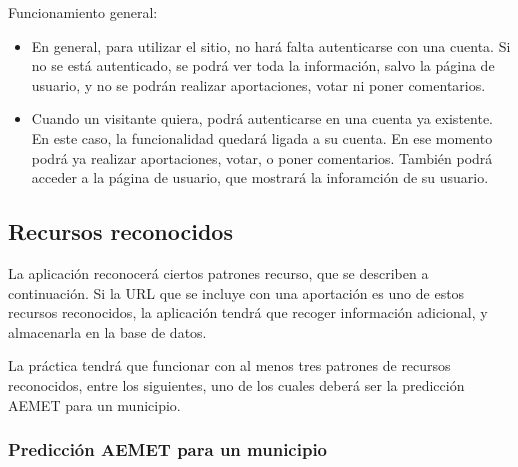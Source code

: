 Funcionamiento general:

\begin{itemize}
\item En general, para utilizar el sitio, no hará falta autenticarse con una cuenta. Si no se está autenticado, se podrá ver toda la información, salvo la página de usuario, y no se podrán realizar aportaciones, votar ni poner comentarios.

\item Cuando un visitante quiera, podrá autenticarse en una cuenta ya existente. En este caso, la funcionalidad quedará ligada a su cuenta. En ese momento podrá ya realizar aportaciones, votar, o poner comentarios. También podrá acceder a la página de usuario, que mostrará la inforamción de su usuario.
  
\end{itemize}


\subsection{Recursos reconocidos}
\label{sec:practica-final-2021-05:reconocidos}

La aplicación reconocerá ciertos patrones recurso, que se describen a continuación. Si la URL que se incluye con una aportación es uno de estos recursos reconocidos, la aplicación tendrá que recoger información adicional, y almacenarla en la base de datos.

La práctica tendrá que funcionar con al menos tres patrones de recursos reconocidos, entre los siguientes, uno de los cuales deberá ser la predicción AEMET para un municipio.

\subsubsection{Predicción AEMET para un municipio}

